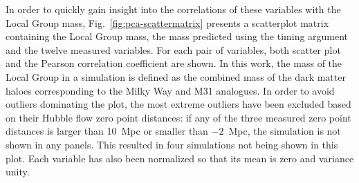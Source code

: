 \documentclass[english, twoside]{HYgradu}
\begin{document}
In order to quickly gain insight into the correlations of these variables with the Local Group mass, Fig.~\ref{fig:pca-scattermatrix} presents a scatterplot matrix containing the Local Group mass, the mass predicted using the timing argument and the twelve measured variables. For each pair of variables, both scatter plot and the Pearson correlation coefficient are shown. In this work, the mass of the Local Group in a simulation is defined as the combined mass of the dark matter haloes corresponding to the Milky Way and M31 analogues. In order to avoid outliers dominating the plot, the most extreme outliers have been excluded based on their Hubble flow zero point distances: if any of the three measured zero point distances is larger than 10~Mpc or smaller than $-2$~Mpc, the simulation is not shown in any panels. This resulted in four simulations not being shown in this plot. Each variable has also been normalized so that its mean is zero and variance unity.
\end{document}
